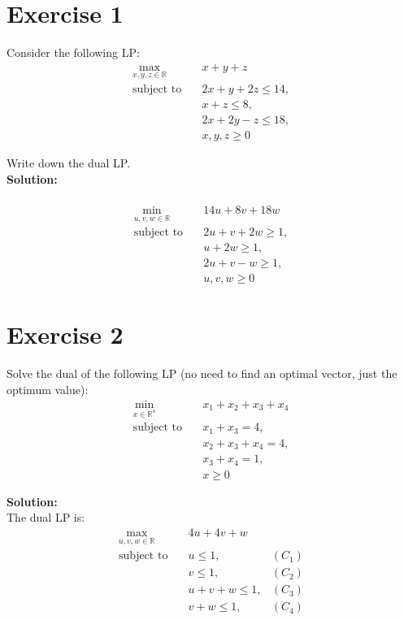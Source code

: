\documentclass{article}
\begin{document}
\section*{Exercise 1}
Consider the following LP:
\begin{align*}
\max_{x, y, z \in \mathbb{R}} \quad & x + y + z \\
\text{subject to} \quad & 2x + y + 2z \leq 14, \\
& x + z \leq 8, \\
& 2x + 2y - z \leq 18, \\
& x, y, z \geq 0
\end{align*}

Write down the dual LP. \\

\textbf{Solution:} \\

 \\
\begin{align*}
\min_{u, v, w \in \mathbb{R}} \quad & 14u + 8v + 18w \\
\text{subject to} \quad & 2u + v + 2w \geq 1, \\
& u + 2w \geq 1, \\
& 2u + v - w \geq 1, \\
& u, v, w \geq 0
\end{align*}

\newpage

\section*{Exercise 2}
Solve the dual of the following LP (no need to find an optimal vector, just the optimum value):
\begin{align*}
\min_{x \in \mathbb{R}^4} \quad & x_1 + x_2 + x_3 + x_4 \\
\text{subject to} \quad & x_1 + x_3 = 4, \\
& x_2 + x_3 + x_4 = 4, \\
& x_3 + x_4 = 1, \\
& x \geq 0
\end{align*}

\textbf{Solution:} \\

The dual LP is:
\begin{align*}
\max_{u, v, w \in \mathbb{R}} \quad & 4u + 4v + w \\
\text{subject to} \quad & u \leq 1, &(C_1)\\
& v \leq 1, &(C_2)\\
& u + v + w \leq 1, &(C_3)\\
& v + w \leq 1, &(C_4)
\end{align*}
\end{document}
